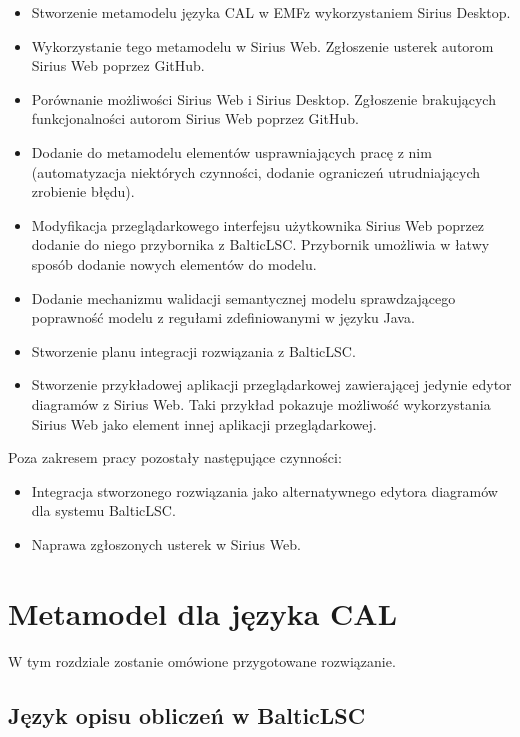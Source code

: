 \begin{itemize}
	\item Stworzenie metamodelu języka \gls{CAL} w \gls{EMF}\@ z wykorzystaniem Sirius Desktop.
	\item Wykorzystanie tego metamodelu w Sirius Web. Zgłoszenie usterek autorom Sirius Web poprzez GitHub.
	\item Porównanie możliwości Sirius Web i Sirius Desktop. Zgłoszenie brakujących funkcjonalności autorom Sirius Web poprzez GitHub.
	\item Dodanie do metamodelu elementów usprawniających pracę z nim (automatyzacja niektórych czynności, dodanie ograniczeń utrudniających zrobienie błędu).
	\item Modyfikacja przeglądarkowego interfejsu użytkownika Sirius Web poprzez dodanie do niego przybornika z BalticLSC\@. Przybornik umożliwia w łatwy sposób dodanie nowych elementów do modelu.
	\item Dodanie mechanizmu walidacji semantycznej modelu sprawdzającego poprawność modelu z regułami zdefiniowanymi w języku Java.
	\item Stworzenie planu integracji rozwiązania z BalticLSC\@.
	\item Stworzenie przykładowej aplikacji przeglądarkowej zawierającej jedynie edytor diagramów z Sirius Web. Taki przykład pokazuje możliwość wykorzystania Sirius Web jako element innej aplikacji przeglądarkowej.
\end{itemize}

\vspace{1em}

\noindent Poza zakresem pracy pozostały następujące czynności:

\begin{itemize}
	\item Integracja stworzonego rozwiązania jako alternatywnego edytora diagramów dla systemu BalticLSC\@.
	\item Naprawa zgłoszonych usterek w Sirius Web.
\end{itemize}



\chapter{Metamodel dla języka CAL}

W tym rozdziale zostanie omówione przygotowane rozwiązanie.

\section{Język opisu obliczeń w BalticLSC}

